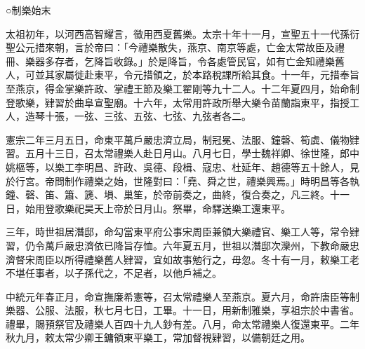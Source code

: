 
\begin{pinyinscope}

 ○制樂始末



 太祖初年，以河西高智耀言，徵用西夏舊樂。太宗十年十一月，宣聖五十一代孫衍聖公元措來朝，言於帝曰：「今禮樂散失，燕京、南京等處，亡金太常故臣及禮冊、樂器多存者，乞降旨收錄。」於是降旨，令各處管民官，如有亡金知禮樂舊人，可並其家屬徙赴東平，令元措領之，於本路稅課所給其食。十一年，元措奉旨至燕京，得金掌樂許政、掌禮王節及樂工翟剛等九十二人。十二年夏四月，始命制登歌樂，肄習於曲阜宣聖廟。十六年，太常用許政所舉大樂令苗蘭詣東平，指授工人，造琴十張，一弦、三弦、五弦、七弦、九弦者各二。



 憲宗二年三月五日，命東平萬戶嚴忠濟立局，制冠冕、法服、鐘磬、筍虡、儀物肄習。五月十三日，召太常禮樂人赴日月山。八月七日，學士魏祥卿、徐世隆，郎中姚樞等，以樂工李明昌、許政、吳德、段楫、寇忠、杜延年、趙德等五十餘人，見於行宮。帝問制作禮樂之始，世隆對曰：「堯、舜之世，禮樂興焉。」時明昌等各執鐘、磬、笛、簫、篪、塤、巢笙，於帝前奏之，曲終，復合奏之，凡三終。十一日，始用登歌樂祀昊天上帝於日月山。祭畢，命驛送樂工還東平。



 三年，時世祖居潛邸，命勾當東平府公事宋周臣兼領大樂禮官、樂工人等，常令肄習，仍令萬戶嚴忠濟依已降旨存恤。六年夏五月，世祖以潛邸次灤州，下教命嚴忠濟督宋周臣以所得禮樂舊人肄習，宜如故事勉行之，毋忽。冬十有一月，敕樂工老不堪任事者，以子孫代之，不足者，以他戶補之。



 中統元年春正月，命宣撫廉希憲等，召太常禮樂人至燕京。夏六月，命許唐臣等制樂器、公服、法服，秋七月七日，工畢。十一日，用新制雅樂，享祖宗於中書省。禮畢，賜預祭官及禮樂人百四十九人鈔有差。八月，命太常禮樂人復還東平。二年秋九月，敕太常少卿王鏞領東平樂工，常加督視肄習，以備朝廷之用。




\end{pinyinscope}
